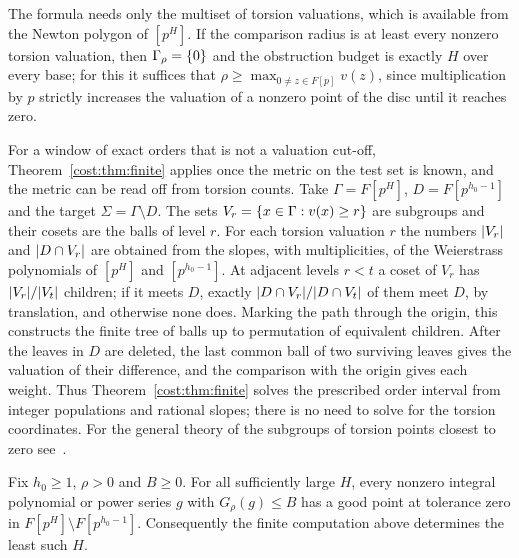 The formula needs only the multiset of torsion valuations, which is available from the
Newton polygon of $[p^H]$. If the comparison radius is at least every nonzero torsion
valuation, then $\Gamma_\rho=\{0\}$ and the obstruction budget is exactly $H$ over every
base; for this it suffices that $\rho\ge\max_{0\ne z\in F[p]}v(z)$, since multiplication by
$p$ strictly increases the valuation of a nonzero point of the disc until it reaches zero.

For a window of exact orders that is not a valuation cut-off, Theorem~\ref{cost:thm:finite} applies
once the metric on the test set is known, and the metric can be read off from torsion
counts. Take $\Gamma=F[p^H]$, $D=F[p^{h_0-1}]$ and the target $\Sigma=\Gamma\setminus D$. The
sets $V_r=\{x\in\Gamma:v(x)\ge r\}$ are subgroups and their cosets are the balls of level
$r$. For each torsion valuation $r$ the numbers $\lvert V_r\rvert$ and $\lvert D\cap V_r\rvert$ are
obtained from the slopes, with multiplicities, of the Weierstrass polynomials of $[p^H]$ and
$[p^{h_0-1}]$. At adjacent levels $r<t$ a coset of $V_r$ has $\lvert V_r\rvert/\lvert V_t\rvert$ children;
if it meets $D$, exactly $\lvert D\cap V_r\rvert/\lvert D\cap V_t\rvert$ of them meet $D$, by translation,
and otherwise none does. Marking the path through the origin, this constructs the finite
tree of balls up to permutation of equivalent children. After the leaves in $D$ are deleted,
the last common ball of two surviving leaves gives the valuation of their difference, and
the comparison with the origin gives each weight. Thus Theorem~\ref{cost:thm:finite} solves the
prescribed order interval from integer populations and rational slopes; there is no need to
solve for the torsion coordinates. For the general theory of the subgroups of torsion points
closest to zero see~\cite{Rabinoff2009Higher}.

\begin{corollary}\label{cost:cor:termination}
Fix $h_0\ge1$, $\rho>0$ and $B\ge0$. For all sufficiently large $H$, every nonzero integral
polynomial or power series $g$ with $G_\rho(g)\le B$ has a good point at tolerance zero in
$F[p^H]\setminus F[p^{h_0-1}]$. Consequently the finite computation above determines the
least such $H$.
\end{corollary}

